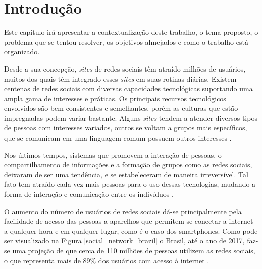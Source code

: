 \chapter*[Introdução]{Introdução}

Este capítulo irá apresentar a contextualização deste trabalho, o tema proposto, o problema que se tentou resolver, os objetivos almejados e como o trabalho está organizado.

Desde a sua concepção, \textit{sites} de redes sociais têm atraído milhões de usuários, muitos dos quais têm integrado esses \textit{sites} em suas rotinas diárias. Existem centenas de redes sociais com diversas capacidades tecnológicas suportando uma ampla gama de interesses e práticas. Os principais recursos tecnológicos envolvidos são bem consistentes e semelhantes, porém as culturas que estão impregnadas podem variar bastante. Alguns \textit{sites} tendem a atender diversos tipos de pessoas com interesses variados, outros se voltam a grupos mais específicos, que se comunicam em uma linguagem comum possuem outros interesses \cite{Boyd:Ellison:2007}.

Nos últimos tempos, sistemas que promovem a interação de pessoas, o compartilhamento de informações e a formação de grupos como as redes sociais, deixaram de ser uma tendência, e se estabeleceram de maneira irreversível. Tal fato tem atraído cada vez mais pessoas para o uso dessas tecnologias, mudando a forma de interação e comunicação entre os indivíduos \cite{Santana:Melo-Solarte:Neris:Miranda:Baranauskas:2009}.

O aumento do número de usuários de redes sociais dá-se principalmente pela facilidade de acesso das pessoas a aparelhos que permitem se conectar a internet a qualquer hora e em qualquer lugar, como é o caso dos smartphones. Como pode ser visualizado na Figura \ref{social_network_brazil} o Brasil, até o ano de 2017, faz-se uma projeção de que cerca de 110 milhões de pessoas utilizem as redes sociais, o que representa mais de 89\% dos usuários com acesso à internet \cite{eMarketer:2013}.

\newpage

